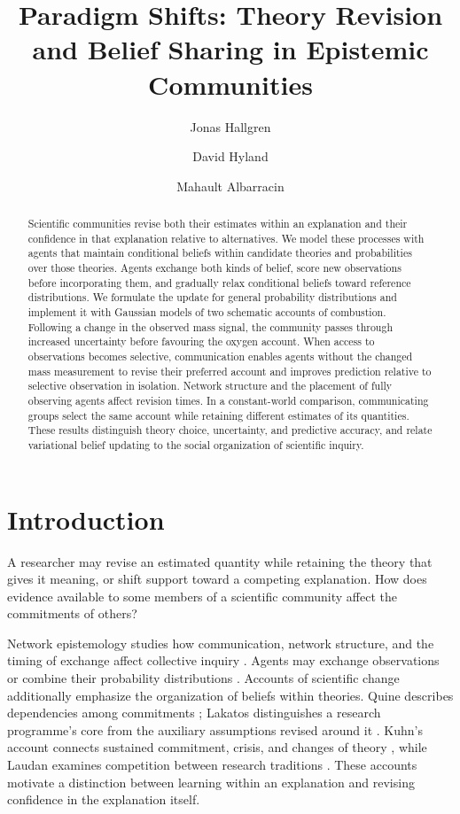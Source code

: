 \documentclass[runningheads]{llncs}
\title{Paradigm Shifts: Theory Revision and Belief Sharing in Epistemic Communities}
\author{Jonas Hallgren\inst{1} \and David Hyland\inst{2} \and Mahault Albarracin\inst{3}}
\institute{Affiliation 1 \email{...} \and Affiliation 2 \and Affiliation 3}
\begin{document}
\raggedbottom
\maketitle
\begin{abstract}
Scientific communities revise both their estimates within an explanation and their
confidence in that explanation relative to alternatives. We model these processes
with agents that maintain conditional beliefs within candidate theories and
probabilities over those theories. Agents exchange both kinds of belief, score new
observations before incorporating them, and gradually relax conditional beliefs
toward reference distributions. We formulate the update for general probability
distributions and implement it with Gaussian models of two schematic accounts of
combustion. Following a change in the observed mass signal, the community passes
through increased uncertainty before favouring the oxygen account. When access to
observations becomes selective, communication enables agents without the changed
mass measurement to revise their preferred account and improves prediction relative
to selective observation in isolation. Network structure and the placement of
fully observing agents affect revision times. In a constant-world comparison,
communicating groups select the same account while retaining different estimates
of its quantities. These results distinguish theory choice, uncertainty, and
predictive accuracy, and relate variational belief updating to the social
organization of scientific inquiry.
\end{abstract}

\section{Introduction}
\label{sec:introduction}
A researcher may revise an estimated quantity while retaining the theory that
gives it meaning, or shift support toward a competing explanation. How does
evidence available to some members of a scientific community affect the
commitments of others?

Network epistemology studies how communication, network structure, and the timing
of exchange affect collective inquiry \citep{balagoyal1998,zollman2010,zollman2013}.
Agents may exchange observations or combine their probability distributions
\citep{degroot1974,genest1986}. Accounts of scientific change additionally emphasize
the organization of beliefs within theories. Quine describes dependencies among
commitments \citep{quine1951}; Lakatos distinguishes a research programme's core
from the auxiliary assumptions revised around it \citep{lakatos1970}. Kuhn's
account connects sustained commitment, crisis, and changes of theory
\citep{kuhn1962}, while Laudan examines competition between research traditions
\citep{laudan1977}. These accounts motivate a distinction between learning within
an explanation and revising confidence in the explanation itself.
\end{document}
